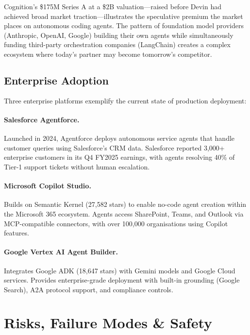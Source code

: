 \documentclass[12pt, a4paper]{article}
\begin{document}
Cognition's \$175M Series A at a \$2B valuation---raised before Devin had achieved broad market traction---illustrates the speculative premium the market places on autonomous coding agents. The pattern of foundation model providers (Anthropic, OpenAI, Google) building their own agents while simultaneously funding third-party orchestration companies (LangChain) creates a complex ecosystem where today's partner may become tomorrow's competitor.

\subsection{Enterprise Adoption}
Three enterprise platforms exemplify the current state of production deployment:

\paragraph{Salesforce Agentforce.} Launched in 2024, Agentforce deploys autonomous service agents that handle customer queries using Salesforce's CRM data. Salesforce reported 3,000+ enterprise customers in its Q4 FY2025 earnings, with agents resolving 40\% of Tier-1 support tickets without human escalation.

\paragraph{Microsoft Copilot Studio.} Builds on Semantic Kernel (27,582 stars) to enable no-code agent creation within the Microsoft 365 ecosystem. Agents access SharePoint, Teams, and Outlook via MCP-compatible connectors, with over 100,000 organisations using Copilot features.

\paragraph{Google Vertex AI Agent Builder.} Integrates Google ADK (18,647 stars) with Gemini models and Google Cloud services. Provides enterprise-grade deployment with built-in grounding (Google Search), A2A protocol support, and compliance controls.

\section{Risks, Failure Modes \& Safety}\label{sec:risks}
\end{document}
